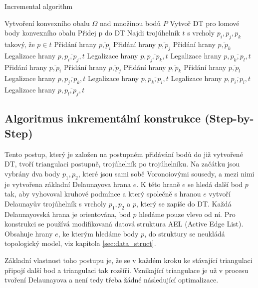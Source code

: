 \documentclass[12pt,a4paper]{article}
\begin{document}
\begin{algorithm}
\caption{Incremental algorithm}
\begin{algorithmic}[1]
\State Vytvoření konvexního obalu $\Omega$ nad množinou bodů $P$
\State Vytvoř DT pro lomové body konvexního obalu
	\State Přidej p do DT
	\State Najdi trojúhelník $t$ s vrcholy $p_i, p_j, p_k$ takový, že $p \in t$
		\State Přidání hrany $\overline{p,p_i}$
		\State Přidání hrany $\overline{p,p_j}$
		\State Přidání hrany $\overline{p,p_k}$
		\State Legalizace hrany $p,\overline{p_i,p_j},t$
		\State Legalizace hrany $p,\overline{p_j,p_k},t$
		\State Legalizace hrany $p,\overline{p_k,p_l},t$
		\State Přidání hrany $\overline{p,p_i}$
		\State Přidání hrany $\overline{p,p_j}$
		\State Přidání hrany $\overline{p,p_k}$
		\State Přidání hrany $\overline{p,p_l}$
		\State Legalizace hrany $p,\overline{p_j,p_k},t$
		\State Legalizace hrany $p,\overline{p_k,p_i},t$
		\State Legalizace hrany $p,\overline{p_i,p_l},t$
		\State Legalizace hrany $p,\overline{p_l,p_j},t$
	\EndIf
\EndFor
\end{algorithmic}
\end{algorithm}

\newpage
\subsection{Algoritmus inkrementální konstrukce (Step-by-Step)}

Tento postup, který je založen na postupném přidávání bodů do již vytvořené DT, tvoří triangulaci postupně, trojúhelník po trojúhelníku. Na začátku jsou vybrány dva body $p_1, p_2$, které jsou sami sobě Voronoiovými sousedy, a mezi nimi je vytvořena základní Delaunayova hrana $e$. K této hraně $e$ se hledá další bod 	$p$ tak, aby vyhovoval kruhové podmínce a který společně s hranou $e$ vytvoří Delaunayův trojúhelník s vrcholy $p_1, p_2$ a $p$, který se zapíše do DT. Každá Delaunayovská hrana je orientována, bod $p$ hledáme pouze vlevo od ní. Pro konstrukci se používá modifikovaná datová struktura AEL (Active Edge List). Obsahuje hrany $e$, ke kterým hledáme body $p$, do struktury se neukládá topologický model, viz kapitola \ref{sec:data_struct}.

Základní vlastnost toho postupu je, že se v každém kroku ke stávající triangulaci připojí další bod a triangulaci tak rozšíří. Vznikající triangulace je už v procesu tvoření Delaunayova a není tedy třeba žádné následující optimalizace.
\end{document}
